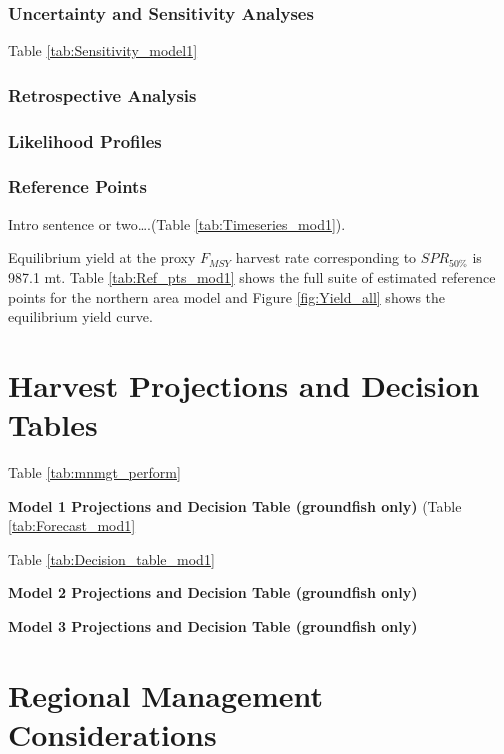 \documentclass[12pt,]{article}
\begin{document}
\subsubsection{Uncertainty and Sensitivity
Analyses}\label{uncertainty-and-sensitivity-analyses}

Table \ref{tab:Sensitivity_model1}

\subsubsection{Retrospective Analysis}\label{retrospective-analysis}

\subsubsection{Likelihood Profiles}\label{likelihood-profiles}

\subsubsection{Reference Points}\label{reference-points-1}

Intro sentence or two\ldots{}.(Table \ref{tab:Timeseries_mod1}).

Equilibrium yield at the proxy \(F_{MSY}\) harvest rate corresponding to
\(SPR_{50\%}\) is 987.1 mt. Table \ref{tab:Ref_pts_mod1} shows the full
suite of estimated reference points for the northern area model and
Figure \ref{fig:Yield_all} shows the equilibrium yield curve.

\section{Harvest Projections and Decision
Tables}\label{harvest-projections-and-decision-tables}

Table \ref{tab:mnmgt_perform}

\textbf{Model 1 Projections and Decision Table (groundfish only)} (Table
\ref{tab:Forecast_mod1}

Table \ref{tab:Decision_table_mod1}

\textbf{Model 2 Projections and Decision Table (groundfish only)}

\textbf{Model 3 Projections and Decision Table (groundfish only)}

\section{Regional Management
Considerations}\label{regional-management-considerations}
\end{document}
